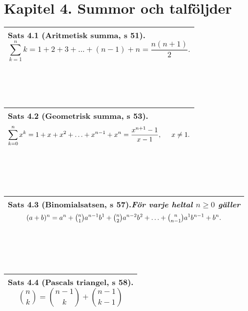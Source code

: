 \documentclass[a4paper]{article}
\begin{document}
\section*{Kapitel 4. Summor och talföljder}
\begin{tabular}{|L{11.5cm}|} \hline
\textbf{Sats 4.1} (Aritmetisk summa, s 51). 
\begin{displaymath}
\sum_{k=1}^{n} k = 1+2+3+\ldots+(n-1)+n=\frac{n(n+1)}{2}.
\end{displaymath}
\\\hline
\end{tabular}
\\\\\\
\begin{tabular}{|L{11.5cm}|} \hline
\textbf{Sats 4.2} (Geometrisk summa, s 53). 
\begin{displaymath}
\sum_{k=0}^{n} x^k = 1+x+x^2+\ldots+x^{n-1}+x^n=\frac{x^{n+1}-1}{x-1}, \hspace{0.5cm} x \neq 1.
\end{displaymath}
\\\hline
\end{tabular}
\\\\\\
\begin{tabular}{|L{11.5cm}|} \hline
\textbf{Sats 4.3} (Binomialsatsen, s 57).\textit{För varje heltal $n \geq 0$ gäller} 
\begin{displaymath}
(a+b)^n=a^n+\tbinom{n}{1}a^{n-1}b^1+\tbinom{n}{2}a^{n-2}b^2+\ldots+\tbinom{n}{n-1}a^{1}b^{n-1}+b^n.
\end{displaymath}
\\\hline
\end{tabular}
\\\\\\
\begin{tabular}{|L{11.5cm}|} \hline
\textbf{Sats 4.4} (Pascals triangel, s 58).
\begin{displaymath}
\binom{n}{k} = \binom{n-1}{k} + \binom{n-1}{k-1}
\end{displaymath}
\\\hline
\end{tabular}
\end{document}
